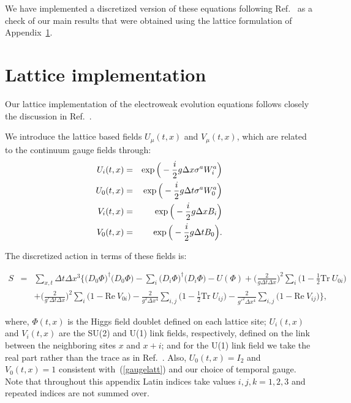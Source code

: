 \documentclass[prd,twocolumn,nofootinbib]{revtex4-1}
\newcommand{\ba}{\begin{eqnarray}}
\newcommand{\ea}{\end{eqnarray}}
\begin{document}
We have implemented a discretized version of these equations following
Ref.~\cite{Vachaspati:2016abz} as a check of our main results that 
were obtained using the lattice formulation of Appendix~\ref{sec:numerical}.


\section{Lattice implementation}
\label{sec:numerical}

Our lattice implementation of the electroweak evolution equations 
follows closely the 
discussion in Ref.~\cite{rajantie2001electroweak}. 

We introduce the lattice based fields $U_\mu(t,x)$ and $V_\mu(t,x)$, which 
are related to the continuum gauge fields through:
\ba
U_i(t,x)&=& \exp{\Big(-\frac{i}{2} g\Delta x \sigma^a W^a_i\Big)}\notag \\
U_0(t,x)&=& \exp{\Big(-\frac{i}{2} g\Delta t \sigma^a W^a_0\Big)}\notag  \\
V_i(t,x)&=& \exp{\Big(-\frac{i}{2} g\Delta x B_i\Big)}\notag  \\
V_0(t,x)&=& \exp{\Big(-\frac{i}{2} g\Delta t B_0\Big)}. 
	\label{gaugelatt}
\ea

The discretized action in terms of these fields is:
\begin{widetext}
\begin{eqnarray}
\nonumber
S &=& \sum_{x,t} \Delta t \Delta x^3 \Bigg\{ \big(D_0\Phi \big)^\dagger \big(D_0\Phi \big) 
- \sum_i \big(D_i\Phi \big)^\dagger \big(D_i\Phi \big) 
-U(\Phi) + \Big(\frac{2}{g\Delta t \Delta x}\Big)^2\sum_i \Big(1-\frac{1}{2}\text{Tr}~U_{0i}\Big) \\ 
&&+\Big(\frac{2}{g'\Delta t \Delta x}\Big)^2 \sum_i \Big(1-\text{Re} ~V_{0i}\Big) 
-\frac{2}{g^2 \Delta x^4} \sum_{i,j} \Big(1-\frac{1}{2} \text{Tr}~U_{ij}\Big) 
	- \frac{2}{g'^2\Delta x^4} \sum_{i,j} \Big(1-\text{Re}~V_{ij}\Big) \Bigg\},
	\label{actionlattice}
\end{eqnarray}
\end{widetext}
where, $\Phi(t,x)$ is the Higgs field doublet defined on each lattice site; 
$U_i(t,x)$ and $V_i(t,x)$ 
are the SU(2) and U(1) link fields, respectively, 
defined on the link between the neighboring sites $x$ and $x+i$;
and for the U(1) link field we take the real part rather than the trace as in 
Ref.~\cite{rajantie2001electroweak}. Also, $U_0(t,x)=I_2$ and $V_0(t,x)=1$
consistent with~(\ref{gaugelatt}) and our choice of temporal gauge.
Note that throughout this appendix Latin indices take values 
$i,j,k = 1,2,3$ and repeated indices are not summed over.
\end{document}
